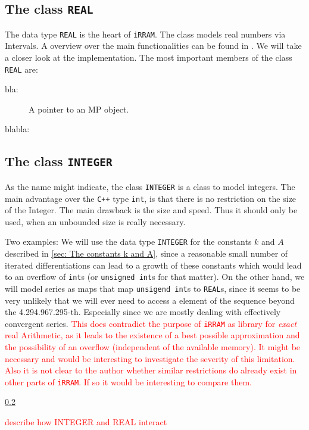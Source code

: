 \documentclass{article}
\newcommand{\irram}{\texttt{iRRAM}\xspace}
\newcommand{\cc}{\texttt{C++}\xspace}
\newcommand{\ir}[1]{\texttt{#1}}
\newcommand{\code}[1]{\texttt{#1}}
\newcommand{\temp}[1]{\textcolor{red}{#1}}
\begin{document}
\subsection{The class \ir{REAL}}

The data type \ir{REAL} is the heart of \irram. The class models real numbers via Intervals. A overview over the main functionalities can be found in \cite{Muller2013}. We will take a closer look at the implementation. The most important members of the class \ir{REAL} are:
\begin{description}
\item[bla:] A pointer to an MP object.
\item[blabla:]
\end{description}

\subsection{The class \ir{INTEGER}}

As the name might indicate, the class \ir{INTEGER} is a class to model integers. The main advantage over the \cc type \code{int}, is that there is no restriction on the size of the Integer. The main drawback is the size and speed. Thus it should only be used, when an unbounded size is really necessary.

Two examples: We will use the data type \ir{INTEGER} for the constants $k$ and $A$ described in \cref{sec: The constants k and A}, since a reasonable small number of iterated differentiations can lead to a growth of these constants which would lead to an overflow of \code{int}s (or \code{unsigned int}s for that matter). On the other hand, we will model series as maps that map \code{unsigend int}s to \code{REAL}s, since it seems to be very unlikely that we will ever need to access a element of the sequence beyond the 4.294.967.295-th. Especially since we are mostly dealing with effectively convergent series. \temp{This does contradict the purpose of \irram as library for \emph{exact} real Arithmetic, as it leads to the existence of a best possible approximation and the possibility of an overflow (independent of the available memory). It might be necessary and would be interesting to investigate the severity of this limitation. Also it is not clear to the author whether similar restrictions do already exist in other parts of \irram. If so it would be interesting to compare them.}

\ref{}

\temp{describe how INTEGER and REAL interact}
\end{document}
